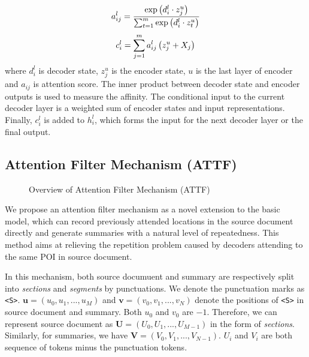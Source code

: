 \begin{equation}\label{eq:a}
\small
    a _ { i j } ^ { l } = \frac { \exp \left( d _ { i } ^ { l } \cdot z _ { j } ^ { u } \right) } { \sum _ { t = 1 } ^ { m } \exp \left( d _ { i } ^ { l } \cdot z _ { t } ^ { u } \right) }
\end{equation}
\begin{equation}\label{eq:c}
\small
    c _ { i } ^ { l } = \sum _ { j = 1 } ^ { m } a _ { i j } ^ { l } \left( z _ { j } ^ { u } + X_j \right)
\end{equation}
where $d_{i}^{l}$ is decoder state, $z_{j}^{u}$ is the encoder state, 
$u$ is the last layer of encoder
and $a_{ij}$ is attention score.
The inner product between decoder state and encoder outputs is used 
to measure the affinity. 
The conditional input to the current 
decoder layer is a weighted sum of encoder states and input representations.
Finally, $c _ { i } ^ { l }$ is added to $h_{i}^{l}$, which forms the input for the next decoder layer or the final output.

\subsection{Attention Filter Mechanism (ATTF)}
\label{sec:attf}

\begin{figure}[th]
	\centering
	\caption{Overview of Attention Filter Mechanism (ATTF)}
	\label{fig:model_main}
\end{figure}


\label{sec:attnf}
We propose an attention filter mechanism as a novel extension 
to the basic model,
which can record previously attended locations 
in the source document directly and generate summaries 
with a natural level of repeatedness. 
This method aims at relieving the repetition problem caused by 
decoders attending to the same POI in source document.

In this mechanism, both source documuent and summary are 
respectively split into 
\textit{sections} and \textit{segments} by punctuations. We
denote the punctuation marks as \verb#<S>#.
$\mathbf{u}=(u_{0},u_{1},...,u_{M})$ 
and $\mathbf{v}=(v_{0},v_{1},...,v_{N})$
denote the positions of \verb#<S># in source document and summary.
Both $u_{0}$ and $v_{0}$ are $-1$.
Therefore, we can represent source document as $\mathbf{U}=(U_{0},U_{1},...,U_{M-1})$ in the form of \textit{sections}. Similarly, for summaries, we have $\mathbf{V}=(V_{0},V_{1},...,V_{N-1})$. 
$U_i$ and $V_i$ are
both sequence of tokens minus the punctuation tokens.


